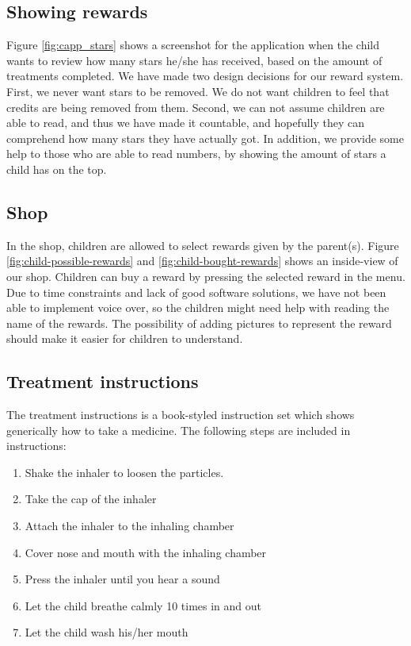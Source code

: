 \subsection{Showing rewards}
\label{sec:description-show-rewards}
Figure \ref{fig:capp_stars} shows a screenshot for the application when the child wants to review how many stars he/she has received, based on the amount of treatments completed. We have made two design decisions for our reward system. First, we never want stars to be removed. We do not want children to feel that credits are being removed from them. Second, we can not assume children are able to read, and thus we have made it countable, and hopefully they can comprehend how many stars they have actually got. In addition, we provide some help to those who are able to read numbers, by showing the amount of stars a child has on the top.      

\subsection{Shop}
\label{sec:description-shop}
In the shop, children are allowed to select rewards given by the parent(s). Figure \ref{fig:child-possible-rewards} and \ref{fig:child-bought-rewards} shows an inside-view of our shop. Children can buy a reward by pressing the selected reward in the menu. Due to time constraints and lack of good software solutions, we have not been able to implement voice over, so the children might need help with reading the name of the rewards. The possibility of adding pictures to represent the reward should make it easier for children to understand. 



\subsection{Treatment instructions}
\label{sec:description-instructions}
The treatment instructions is a book-styled instruction set which shows generically how to take a medicine. 
The following steps are included in instructions: 
\begin{enumerate}
  \item Shake the inhaler to loosen the particles. 
  \item Take the cap of the inhaler
  \item Attach the inhaler to the inhaling chamber
  \item Cover nose and mouth with the inhaling chamber
  \item Press the inhaler until you hear a sound
  \item Let the child breathe calmly 10 times in and out
  \item Let the child wash his/her mouth
\end{enumerate} 

